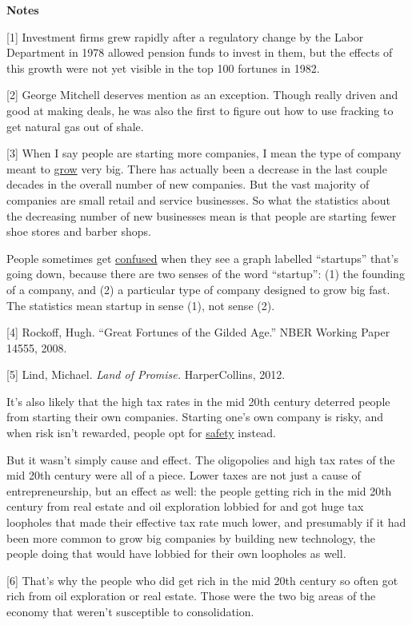 \textbf{Notes}

{[}1{]} Investment firms grew rapidly after a regulatory change by the
Labor Department in 1978 allowed pension funds to invest in them, but
the effects of this growth were not yet visible in the top 100 fortunes
in 1982.

{[}2{]} George Mitchell deserves mention as an exception. Though really
driven and good at making deals, he was also the first to figure out how
to use fracking to get natural gas out of shale.

{[}3{]} When I say people are starting more companies, I mean the type
of company meant to \href{growth.html}{grow} very big. There has
actually been a decrease in the last couple decades in the overall
number of new companies. But the vast majority of companies are small
retail and service businesses. So what the statistics about the
decreasing number of new businesses mean is that people are starting
fewer shoe stores and barber shops.

People sometimes get
\href{https://www.inc.com/magazine/201505/leigh-buchanan/the-vanishing-startups-in-decline.html}{confused}
when they see a graph labelled ``startups'' that's going down, because
there are two senses of the word ``startup'': (1) the founding of a
company, and (2) a particular type of company designed to grow big fast.
The statistics mean startup in sense (1), not sense (2).

{[}4{]} Rockoff, Hugh. ``Great Fortunes of the Gilded Age.'' NBER
Working Paper 14555, 2008.

{[}5{]} Lind, Michael. \emph{Land of Promise.} HarperCollins, 2012.

It's also likely that the high tax rates in the mid 20th century
deterred people from starting their own companies. Starting one's own
company is risky, and when risk isn't rewarded, people opt for
\href{inequality.html}{safety} instead.

But it wasn't simply cause and effect. The oligopolies and high tax
rates of the mid 20th century were all of a piece. Lower taxes are not
just a cause of entrepreneurship, but an effect as well: the people
getting rich in the mid 20th century from real estate and oil
exploration lobbied for and got huge tax loopholes that made their
effective tax rate much lower, and presumably if it had been more common
to grow big companies by building new technology, the people doing that
would have lobbied for their own loopholes as well.

{[}6{]} That's why the people who did get rich in the mid 20th century
so often got rich from oil exploration or real estate. Those were the
two big areas of the economy that weren't susceptible to consolidation.

